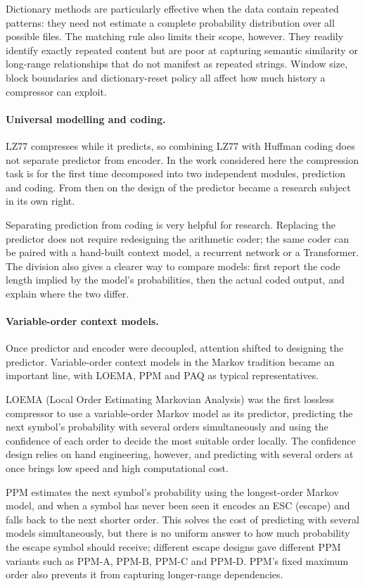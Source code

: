 \documentclass[12pt,a4paper]{article}
\begin{document}
Dictionary methods are particularly effective when the data contain repeated patterns: they
need not estimate a complete probability distribution over all possible files. The matching
rule also limits their scope, however. They readily identify exactly repeated content but
are poor at capturing semantic similarity or long-range relationships that do not manifest
as repeated strings. Window size, block boundaries and dictionary-reset policy all affect
how much history a compressor can exploit.

\paragraph{Universal modelling and coding.}
LZ77 compresses while it predicts, so combining LZ77 with Huffman coding does not separate
predictor from encoder. In the work considered here the compression task is for the first
time decomposed into two independent modules, prediction and coding. From then on the design
of the predictor became a research subject in its own right.

Separating prediction from coding is very helpful for research. Replacing the predictor does
not require redesigning the arithmetic coder; the same coder can be paired with a
hand-built context model, a recurrent network or a Transformer. The division also gives a
clearer way to compare models: first report the code length implied by the model's
probabilities, then the actual coded output, and explain where the two differ.

\paragraph{Variable-order context models.}
Once predictor and encoder were decoupled, attention shifted to designing the predictor.
Variable-order context models in the Markov tradition became an important line, with LOEMA,
PPM and PAQ as typical representatives.

LOEMA (Local Order Estimating Markovian Analysis) was the first lossless compressor to use a
variable-order Markov model as its predictor, predicting the next symbol's probability with
several orders simultaneously and using the confidence of each order to decide the most
suitable order locally. The confidence design relies on hand engineering, however, and
predicting with several orders at once brings low speed and high computational cost.

PPM estimates the next symbol's probability using the longest-order Markov model, and when a
symbol has never been seen it encodes an ESC (escape) and falls back to the next shorter
order. This solves the cost of predicting with several models simultaneously, but there is no
uniform answer to how much probability the escape symbol should receive; different escape
designs gave different PPM variants such as PPM-A, PPM-B, PPM-C and PPM-D. PPM's fixed
maximum order also prevents it from capturing longer-range dependencies.
\end{document}
